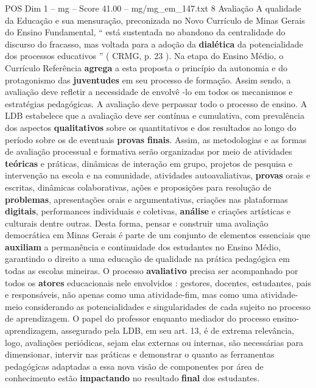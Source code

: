 \begin{textsample}{POS Dim 1 – mg – Score 41.00 – mg/mg\_em\_147.txt}  \label{ex:f1_pos_235}
8 Avaliação A qualidade da Educação e sua mensuração, preconizada no Novo Currículo de Minas Gerais do Ensino Fundamental, “ está sustentada no abandono da centralidade do discurso do fracasso, mas voltada para a adoção da \textbf{dialética} da potencialidade dos processos educativos ” ( CRMG, p. 23 ).
Na etapa do Ensino Médio, o Currículo Referência \textbf{agrega} a esta proposta o princípio da autonomia e do protagonismo das \textbf{juventudes} em seu processo de formação.
Assim sendo, a avaliação deve refletir a necessidade de envolvê -lo em todos os mecanismos e estratégias pedagógicas.
A avaliação deve perpassar todo o processo de ensino.
A LDB estabelece que a avaliação deve ser contínua e cumulativa, com prevalência dos aspectos \textbf{qualitativos} sobre os quantitativos e dos resultados ao longo do período sobre os de eventuais \textbf{provas} \textbf{finais}.
Assim, as metodologias e as formas de avaliação processual e formativa serão organizadas por meio de atividades \textbf{teóricas} e práticas, dinâmicas de interação em grupo, projetos de pesquisa e intervenção na escola e na comunidade, atividades autoavaliativas, \textbf{provas} orais e escritas, dinâmicas colaborativas, ações e proposições para resolução de \textbf{problemas}, apresentações orais e argumentativas, criações nas plataformas \textbf{digitais}, performances individuais e coletivas, \textbf{análise} e criações artísticas e culturais dentre outras.
Desta forma, pensar e construir uma avaliação democrática em Minas Gerais é parte de um conjunto de elementos essenciais que \textbf{auxiliam} a permanência e continuidade dos estudantes no Ensino Médio, garantindo o direito a uma educação de qualidade na prática pedagógica em todas as escolas mineiras.
O processo \textbf{avaliativo} precisa ser acompanhado por todos os \textbf{atores} educacionais nele envolvidos : gestores, docentes, estudantes, pais e responsáveis, não apenas como uma atividade-fim, mas como uma atividade-meio considerando as potencialidades e singularidades de cada sujeito no processo de aprendizagem.
O papel do professor enquanto mediador do processo ensino-aprendizagem, assegurado pela LDB, em seu art. 13, é de extrema relevância, logo, avaliações periódicas, sejam elas externas ou internas, são necessárias para dimensionar, intervir nas práticas e demonstrar o quanto as ferramentas pedagógicas adaptadas a essa nova visão de componentes por área de conhecimento estão \textbf{impactando} no resultado \textbf{final} dos estudantes.

\end{textsample}
